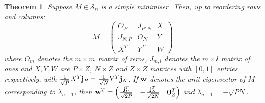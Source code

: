 \documentclass[12pt]{article}
\newtheorem{thm}{Theorem}[section]
\begin{document}
\begin{thm} \label{lambda_n<lambda_n-1} Suppose $M\in \mathcal{S}_n$ is a simple minimiser. Then, up to reordering rows and columns:
\begin{equation*}
    M = \begin{pmatrix} O_{P} & J_{P,N} & X \\ J_{N,P} & O_{N} & Y \\ X^T & Y^T & W
        \end{pmatrix}
\end{equation*}
where $O_m$ denotes the $m\times m$ matrix of zeros, $J_{m,l}$ denotes the $m\times l$ matrix of ones and $X,Y,W$ are $P\times Z$, $N\times Z$ and $Z\times Z$ matrices with $[0,1]$ entries respectively, with $\frac{1}{\sqrt{P}}X^T\bold{j}_P = \frac{1}{\sqrt{N}}Y^T\bold{j}_N$. If $\bold{w}$ denotes the unit eigenvector of $M$ corresponding to $\lambda_{n-1}$, then $\bold{w}^T = \begin{pmatrix} \frac{\bold{j}_P^T}{\sqrt{2P}} & -\frac{\bold{j}_N^T}{\sqrt{2N}} & \bold{0}_{Z}^T \end{pmatrix}$ and $\lambda_{n-1} = -\sqrt{PN}$.
\end{thm}
\end{document}
